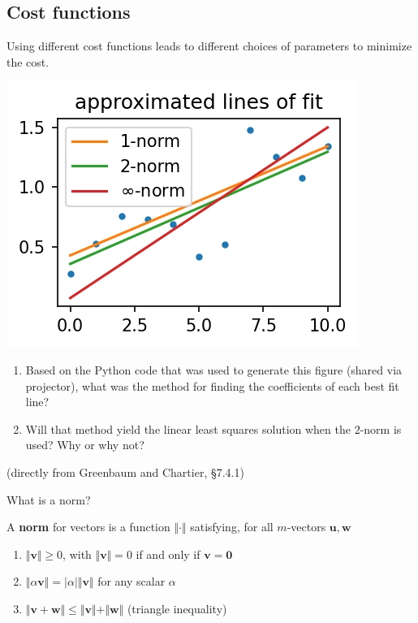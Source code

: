 \documentclass[12pt,letterpaper,noanswers]{exam}
\begin{document}
\subsection{Cost functions}
Using different cost functions leads to different choices of parameters to minimize the cost.

\includegraphics{AM111-F23-CourseNotes/img/c04-line.png}

\begin{enumerate}
\item Based on the Python code that was used to generate this figure (shared via projector), what was the method for finding the coefficients of each best fit line?
\item Will that method yield the linear least squares solution when the $2$-norm is used?  Why or why not?
\end{enumerate}

\begin{tcolorbox}
(directly from Greenbaum and Chartier, \S7.4.1) 

What is a norm?

A \textbf{norm} for vectors is a function $\Vert \cdot \Vert$ satisfying, for all $m$-vectors $\mathbf{u},\mathbf{w}$
\begin{enumerate}
\itemsep0pt
    \item $\Vert \mathbf{v}\Vert \geq 0$, with $\Vert \mathbf{v}\Vert = 0$ if and only if $\mathbf{v} = \mathbf{0}$
    \item $\Vert \alpha \mathbf{v} \Vert= \vert \alpha\vert\Vert\mathbf{v}\Vert$ for any scalar $\alpha$
    \item $\Vert \mathbf{v}+\mathbf{w}\Vert\leq \Vert\mathbf{v}\Vert+\Vert\mathbf{w}\Vert$ (triangle inequality)
\end{enumerate}
\end{tcolorbox}
\end{document}
